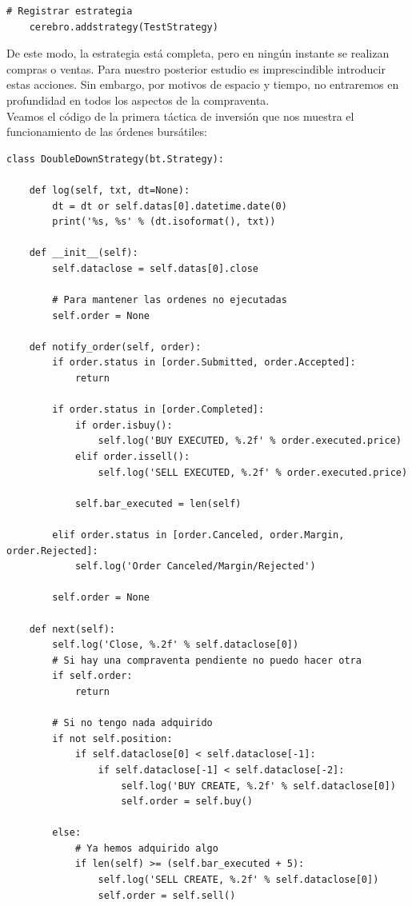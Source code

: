 		\begin{lstlisting}[basicstyle=\tiny]
    # Registrar estrategia
    cerebro.addstrategy(TestStrategy)
		\end{lstlisting}	
		
		\vspace{0.4cm}
		
		De este modo, la estrategia est\'a completa, pero en ning\'un instante se realizan compras o ventas. Para nuestro posterior estudio es imprescindible introducir estas acciones. Sin embargo, por motivos de espacio y tiempo, no entraremos en profundidad en todos los aspectos de la compraventa.\\
		
		Veamos el c\'odigo de la primera t\'actica de inversi\'on que nos muestra el funcionamiento de las \'ordenes burs\'atiles:
		
		
		\begin{lstlisting}[basicstyle=\tiny]
class DoubleDownStrategy(bt.Strategy):

	def log(self, txt, dt=None):
		dt = dt or self.datas[0].datetime.date(0)
		print('%s, %s' % (dt.isoformat(), txt))

	def __init__(self):
		self.dataclose = self.datas[0].close

		# Para mantener las ordenes no ejecutadas
		self.order = None

	def notify_order(self, order):
		if order.status in [order.Submitted, order.Accepted]:
			return

		if order.status in [order.Completed]:
			if order.isbuy():
				self.log('BUY EXECUTED, %.2f' % order.executed.price)
			elif order.issell():
				self.log('SELL EXECUTED, %.2f' % order.executed.price)

			self.bar_executed = len(self)

		elif order.status in [order.Canceled, order.Margin, order.Rejected]:
			self.log('Order Canceled/Margin/Rejected')

		self.order = None

	def next(self):
		self.log('Close, %.2f' % self.dataclose[0])
		# Si hay una compraventa pendiente no puedo hacer otra
		if self.order:
			return

		# Si no tengo nada adquirido
		if not self.position:
			if self.dataclose[0] < self.dataclose[-1]:
				if self.dataclose[-1] < self.dataclose[-2]:
					self.log('BUY CREATE, %.2f' % self.dataclose[0])
					self.order = self.buy()

		else:
			# Ya hemos adquirido algo
			if len(self) >= (self.bar_executed + 5):
				self.log('SELL CREATE, %.2f' % self.dataclose[0])
				self.order = self.sell()
		\end{lstlisting}
		

